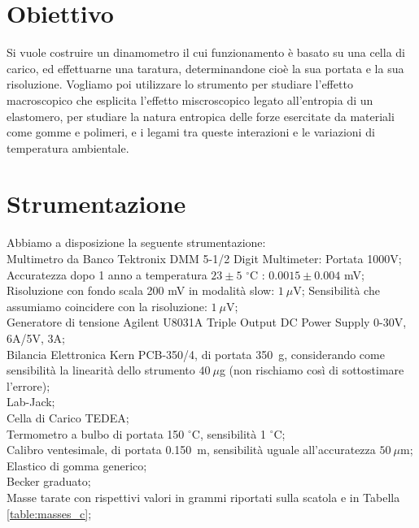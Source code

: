 \documentclass[italian, a4paper, 10pt, twocolumn]{../../style/lab_unige}
\newcommand{\reftab}[1]{Tabella {\ref{#1}}}%
\begin{document}

    \section{Obiettivo}
    \label{section:aim}

    Si vuole costruire un dinamometro il cui funzionamento è basato su una cella di carico, ed effettuarne una taratura, determinandone cioè la sua portata e la sua risoluzione. 
    Vogliamo poi utilizzare lo strumento per studiare l'effetto macroscopico che esplicita l'effetto miscroscopico legato all'entropia di un elastomero, per studiare la natura  entropica delle forze esercitate da materiali come gomme e polimeri, e i legami tra queste interazioni e le variazioni di temperatura ambientale. 

    \section{Strumentazione}
    \label{section:strument}

    Abbiamo a disposizione la seguente strumentazione:\\
    Multimetro da Banco Tektronix DMM 5-1/2 Digit Multimeter:
    Portata 1000V;
    Accuratezza dopo 1 anno a temperatura $23\pm5$ $^\circ$C : $0.0015\pm0.004$ mV;
    Risoluzione con fondo scala 200 mV in modalità slow: $1~\mu$V;
    Sensibilità che assumiamo coincidere con la risoluzione: $1~\mu$V;\\
    Generatore di tensione Agilent U8031A Triple Output DC Power Supply 0-30V, 6A/5V, 3A;\\
    Bilancia Elettronica Kern PCB-350/4, di portata 350~g, considerando come sensibilità la linearità dello strumento $40~\mu$g (non rischiamo così di sottostimare l'errore);\\
    Lab-Jack;\\
    Cella di Carico TEDEA;\\
    Termometro a bulbo di portata 150 $^\circ$C, sensibilità 1 $^\circ$C;\\
    Calibro ventesimale, di portata 0.150~m, sensibilità uguale all'accuratezza $50~\mu$m;\\
    Elastico di gomma generico;\\
    Becker graduato;\\
    Masse tarate con rispettivi valori in grammi riportati sulla scatola e in \reftab{table:masses_c};\\
\end{document}
